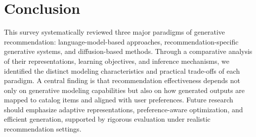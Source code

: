 \documentclass[sigconf,nonacm]{acmart}
\begin{document}
\section{Conclusion}
\label{sec:conclusion}

This survey systematically reviewed three major paradigms
of generative recommendation: language-model-based approaches,
recommendation-specific generative systems, and diffusion-based methods.
Through a comparative analysis of their representations,
learning objectives, and inference mechanisms, we identified
the distinct modeling characteristics and practical trade-offs
of each paradigm. A central finding is that recommendation
effectiveness depends not only on generative modeling
capabilities but also on how generated outputs are mapped
to catalog items and aligned with user preferences.
Future research should emphasize adaptive representations,
preference-aware optimization, and efficient generation,
supported by rigorous evaluation under realistic
recommendation settings.


\balance


\end{document}
